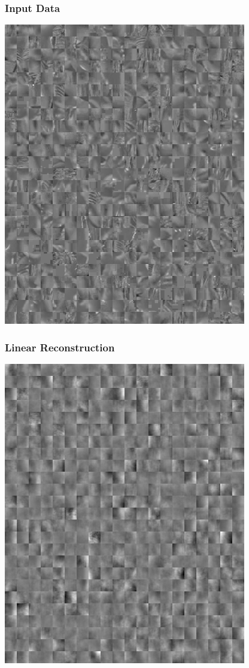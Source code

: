 \documentclass{beamer}
\begin{document}
\begin{frame}
\frametitle{Input Data} 
  \begin{center}
             \includegraphics[scale=0.5]{./figures/input.png} 
    \end{center}
\end{frame} 

\begin{frame}
\frametitle{Linear Reconstruction} 
  \begin{center}
             \includegraphics[scale=0.5]{./figures/pinv.png} 
    \end{center}
\end{frame} 
\end{document}
